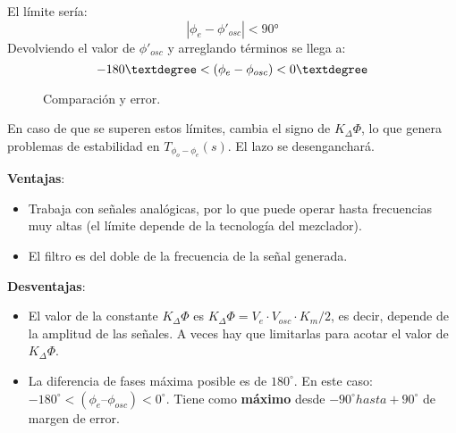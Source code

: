 \documentclass[
	12pt, %
	fleqn, %
	a4paper, %
	oneside, %
]{LegrandOrangeBook}
\begin{document}
El límite sería:
\begin{equation}
|\phi_e-\phi'_{osc}|<90°
\end{equation}
Devolviendo el valor de $\phi'_{osc}$ y arreglando términos se llega a:
\begin{equation}
-180°<\parentesis{\phi_e-\phi_{osc}}<0°
\end{equation}
\begin{figure}[H]
\centering
{}
\caption{Comparación y error.}
\end{figure}
\begin{remark}
En caso de que se superen estos límites, cambia el signo de $K_\Delta\Phi$, lo que genera problemas de estabilidad en $T_{\phi_o-\phi_e}(s)$. El lazo se desenganchará. 
\end{remark}
\textbf{Ventajas}:
\begin{itemize}
\item Trabaja con señales analógicas, por lo que puede operar hasta frecuencias muy altas (el límite depende de la tecnología del mezclador).
\item El filtro es del doble de la frecuencia de la señal generada.
\end{itemize}
\textbf{Desventajas}:
\begin{itemize}
\item El valor de la constante $K_\Delta\Phi$ es $K_\Delta\Phi = V_e\cdot V_{osc}·K_m/2$, es decir,
depende de la amplitud de las señales. A veces hay que limitarlas para acotar el valor de $K_\Delta\Phi$.
\item La diferencia de fases máxima posible es de $180^\circ$. En este caso:
$-180^\circ < (\phi_e – \phi_{osc}) < 0^\circ$. Tiene como \textbf{máximo} desde $-90^\circ hasta +90^\circ$ de margen de error.
\end{itemize}
\end{document}
